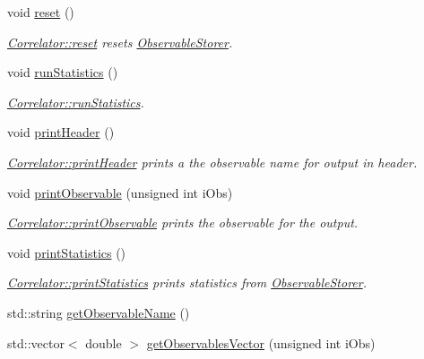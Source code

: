 \begin{DoxyCompactItemize}
void \mbox{\hyperlink{class_super_sampler_ab2f028561e015500fac1e3093aa4a725}{reset}} ()
\begin{DoxyCompactList}\small\item\em \mbox{\hyperlink{class_correlator_aacca40262d2cd62f0a3964e832f948c1}{Correlator\+::reset}} resets \mbox{\hyperlink{class_observable_storer}{Observable\+Storer}}. \end{DoxyCompactList}\item 
void \mbox{\hyperlink{class_super_sampler_af96f7d461e9159adb4eef9bda9c6ecde}{run\+Statistics}} ()
\begin{DoxyCompactList}\small\item\em \mbox{\hyperlink{class_correlator_a35197b1d12b62ef30b79c0138a26456e}{Correlator\+::run\+Statistics}}. \end{DoxyCompactList}\item 
void \mbox{\hyperlink{class_super_sampler_a9bedfcc40a22c48378a6ed63f64e6957}{print\+Header}} ()
\begin{DoxyCompactList}\small\item\em \mbox{\hyperlink{class_correlator_ac7c5a07d7cbee97c417a1659b93083b2}{Correlator\+::print\+Header}} prints a the observable name for output in header. \end{DoxyCompactList}\item 
void \mbox{\hyperlink{class_super_sampler_adf92b9281ee9a782e6c00424dd23451d}{print\+Observable}} (unsigned int i\+Obs)
\begin{DoxyCompactList}\small\item\em \mbox{\hyperlink{class_correlator_a15744ddb9f2b71fff34ac762d101df38}{Correlator\+::print\+Observable}} prints the observable for the output. \end{DoxyCompactList}\item 
void \mbox{\hyperlink{class_super_sampler_a04b230314ae446c77172c97ff52cf4f3}{print\+Statistics}} ()
\begin{DoxyCompactList}\small\item\em \mbox{\hyperlink{class_correlator_a2168d677f547769784781d2e2aaa53cf}{Correlator\+::print\+Statistics}} prints statistics from \mbox{\hyperlink{class_observable_storer}{Observable\+Storer}}. \end{DoxyCompactList}\item 
std\+::string \mbox{\hyperlink{class_super_sampler_a84d3ba9a56dd2a36cb11d495c32f5ca6}{get\+Observable\+Name}} ()
\item 
std\+::vector$<$ double $>$ \mbox{\hyperlink{class_super_sampler_a2b81588289576169c2148a88ddad482f}{get\+Observables\+Vector}} (unsigned int i\+Obs)

\end{DoxyCompactItemize}
